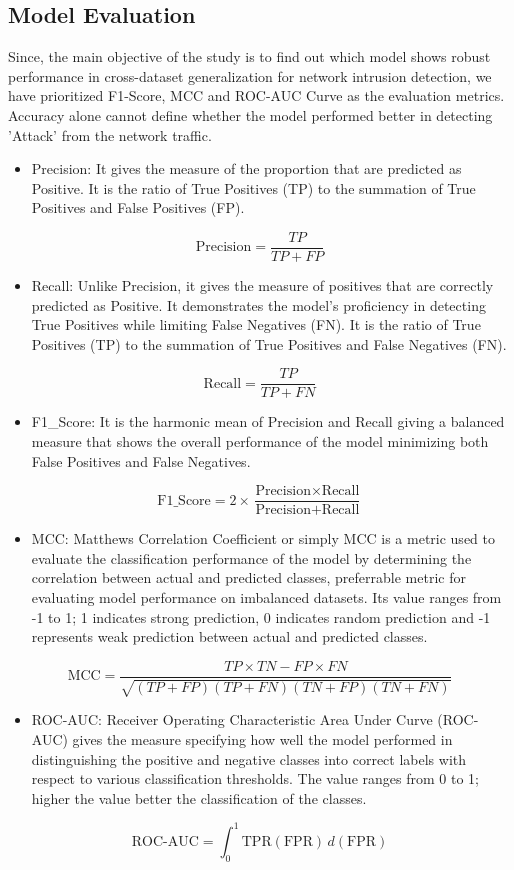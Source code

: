 \subsection{Model Evaluation}
Since, the main objective of the study is to find out which model shows robust performance in cross-dataset generalization for network intrusion detection,
we have prioritized F1-Score, MCC and ROC-AUC Curve as the evaluation metrics. Accuracy alone cannot define whether the model performed better in detecting 
'Attack' from the  network traffic. 
\begin{itemize}
    \item {Precision:} It gives the measure of the proportion that are predicted as Positive. It is the ratio of True Positives (TP) to the summation of 
    True Positives and False Positives (FP).  
\end{itemize}
\[
\text{Precision} = \frac{TP}{TP+FP}
\]
\begin{itemize}
    \item Recall: Unlike Precision, it gives the measure of positives that are correctly predicted as Positive. It demonstrates the model's proficiency in detecting
    True Positives while limiting False Negatives (FN). It is the ratio of True Positives (TP) to the summation of True Positives and False Negatives (FN).
\end{itemize}
\[
\text{Recall} = \frac{TP}{TP+FN}
\]
\begin{itemize}
    \item {F1\_Score:} It is the harmonic mean of Precision and Recall giving a balanced measure that shows the overall performance of the model minimizing both 
    False Positives and False Negatives.
\end{itemize}
\[
\text{F1\_Score} = 2 \times \frac{\text{Precision} \times \text{Recall}}
{\text{Precision} + \text{Recall}}
\]
\begin{itemize}
    \item {MCC:} Matthews Correlation Coefficient or simply MCC is a metric used to evaluate the classification performance of the model by determining the correlation between
    actual and predicted classes, preferrable metric for evaluating model performance on imbalanced datasets. Its value ranges from -1 to 1; 1 indicates strong prediction, 0 
    indicates random prediction and -1 represents weak prediction between actual and predicted classes.
\end{itemize}
\[
\text{MCC} = \frac{TP \times TN - FP \times FN}
{\sqrt{(TP+FP)(TP+FN)(TN+FP)(TN+FN)}}
\]
\begin{itemize}
    \item {ROC-AUC:} Receiver Operating Characteristic Area Under Curve (ROC-AUC) gives the measure specifying how well the model performed in distinguishing the positive 
    and negative classes into correct labels with respect to various classification thresholds. The value ranges from 0 to 1; higher the value better the classification of 
    the classes. 
\end{itemize}
\[
\text{ROC-AUC} = \int_{0}^{1} \mathrm{TPR}(\mathrm{FPR}) \, d(\mathrm{FPR})
\]
